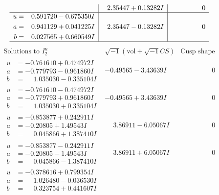 \documentclass[1p]{elsarticle_modified}
\theoremstyle{definition}
\newcommand{\I}{\sqrt{-1}}
\begin{document}
$$\begin{array}{c|c|c}
 & \phantom{-}2.35447 + 0.13282 I & \phantom{-0.000000 } 0 \\ \hline\begin{aligned}
u &= \phantom{-}0.591720 - 0.675350 I \\
a &= \phantom{-}0.941129 + 0.041225 I \\
b &= \phantom{-}0.027565 + 0.660549 I\end{aligned}
 & \phantom{-}2.35447 - 0.13282 I & \phantom{-0.000000 } 0\\
 \hline 
 \end{array}$$\newpage$$\begin{array}{c|c|c}  
\text{Solutions to }I^u_{2}& \I (\text{vol} + \sqrt{-1}CS) & \text{Cusp shape}\\
 \hline 
\begin{aligned}
u &= -0.761610 + 0.474972 I \\
a &= -0.779793 - 0.961860 I \\
b &= \phantom{-}1.035030 - 0.335104 I\end{aligned}
 & -0.49565 - 3.43639 I & \phantom{-0.000000 } 0 \\ \hline\begin{aligned}
u &= -0.761610 - 0.474972 I \\
a &= -0.779793 + 0.961860 I \\
b &= \phantom{-}1.035030 + 0.335104 I\end{aligned}
 & -0.49565 + 3.43639 I & \phantom{-0.000000 } 0 \\ \hline\begin{aligned}
u &= -0.853877 + 0.242911 I \\
a &= -0.20805 + 1.49543 I \\
b &= \phantom{-}0.045866 + 1.387410 I\end{aligned}
 & \phantom{-}3.86911 - 6.05067 I & \phantom{-0.000000 } 0 \\ \hline\begin{aligned}
u &= -0.853877 - 0.242911 I \\
a &= -0.20805 - 1.49543 I \\
b &= \phantom{-}0.045866 - 1.387410 I\end{aligned}
 & \phantom{-}3.86911 + 6.05067 I & \phantom{-0.000000 } 0 \\ \hline\begin{aligned}
u &= -0.378616 + 0.799354 I \\
a &= \phantom{-}1.026480 - 0.036530 I \\
b &= \phantom{-}0.323754 + 0.441607 I\end{aligned}

\end{array}$$
\end{document}
